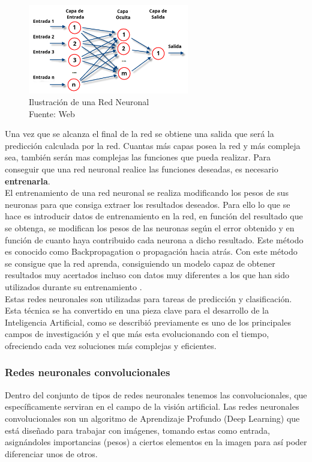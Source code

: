 \begin{figure}[H]
    \begin{center}
        \includegraphics[width=7cm]{img/capitulo_2/Redes_neuronales_esquema.png}
    \end{center}
    \caption{Ilustración de una Red Neuronal
        \\Fuente: Web}
    \label{fig:estructura_red_neuronal}
\end{figure}

Una vez que se alcanza el final de la red se obtiene una salida que será la predicción calculada por la red. Cuantas más capas posea la red y más compleja sea, también serán mas complejas las funciones que pueda realizar. Para conseguir que una red neuronal realice las funciones deseadas, es necesario \textbf{entrenarla}.\\

El entrenamiento de una red neuronal se realiza modificando los pesos de sus neuronas para que consiga extraer los resultados deseados. Para ello lo que se hace es introducir datos de entrenamiento en la red, en función del resultado que se obtenga, se modifican los pesos de las neuronas según el error obtenido y en función de cuanto haya contribuido cada neurona a dicho resultado. Este método es conocido como Backpropagation o propagación hacia atrás. Con este método se consigue que la red aprenda, consiguiendo un modelo capaz de obtener resultados muy acertados incluso con datos muy diferentes a los que han sido utilizados durante su entrenamiento \cite{atriainnovation:ia}.\\

Estas redes neuronales son utilizadas para tareas de predicción y clasificación. Esta técnica se ha convertido en una pieza clave para el desarrollo de la Inteligencia Artificial, como se describió previamente es uno de los principales campos de investigación y el que más esta evolucionando con el tiempo, ofreciendo cada vez soluciones más complejas y eficientes.

\subsubsection{Redes neuronales convolucionales}
Dentro del conjunto de tipos de redes neuronales tenemos las convolucionales, que específicamente serviran en el campo de la visión artificial. Las redes neuronales convolucionales son un algoritmo de Aprendizaje Profundo (Deep Learning) que está diseñado para trabajar con imágenes, tomando estas como entrada, asignándoles importancias (pesos) a ciertos elementos en la imagen para así poder diferenciar unos de otros.\\

